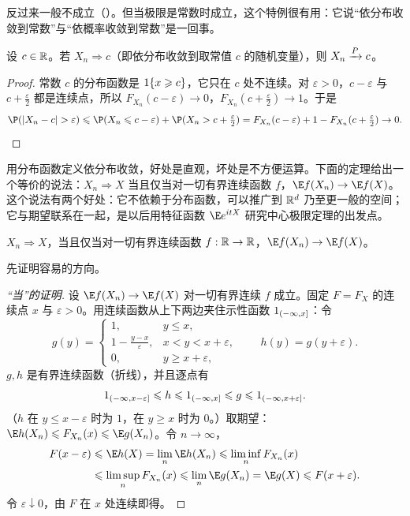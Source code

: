 反过来一般不成立（）。但当极限是常数时成立，这个特例很有用：它说“依分布收敛到常数”与“依概率收敛到常数”是一回事。

\begin{theorem}\label{thm:convergence:d-to-constant}
设 $c\in\mathbb{R}$。若 $X_n\Rightarrow c$（即依分布收敛到取常值 $c$ 的随机变量），则 $X_n\xrightarrow{P} c$。
\end{theorem}
\begin{proof}
常数 $c$ 的分布函数是 $1\{x\geqslant c\}$，它只在 $c$ 处不连续。对 $\varepsilon>0$，$c-\varepsilon$ 与 $c+\frac\varepsilon2$ 都是连续点，所以 $F_{X_n}(c-\varepsilon)\to0$，$F_{X_n}(c+\frac\varepsilon2)\to1$。于是
\[
\P(\abs{X_n-c}>\varepsilon)\leqslant \P(X_n\leqslant c-\varepsilon)+\P(X_n>c+\tfrac\varepsilon2)=F_{X_n}(c-\varepsilon)+1-F_{X_n}(c+\tfrac\varepsilon2)\to0 .\qedhere
\]
\end{proof}


用分布函数定义依分布收敛，好处是直观，坏处是不方便运算。下面的定理给出一个等价的说法：$X_n\Rightarrow X$ 当且仅当对一切有界连续函数 $f$，$\E f(X_n)\to \E f(X)$。这个说法有两个好处：它不依赖于分布函数，可以推广到 $\mathbb{R}^d$ 乃至更一般的空间；它与期望联系在一起，是以后用特征函数 $\E e^{itX}$ 研究中心极限定理的出发点。

\begin{theorem}[依分布收敛的等价刻画]\label{thm:convergence:bounded-continuous}
$X_n\Rightarrow X$，当且仅当对一切有界连续函数 $f:\mathbb{R}\to\mathbb{R}$，$\E f(X_n)\to \E f(X)$。
\end{theorem}

先证明容易的方向。

\begin{proof}[“当”的证明]
设 $\E f(X_n)\to \E f(X)$ 对一切有界连续 $f$ 成立。固定 $F=F_X$ 的连续点 $x$ 与 $\varepsilon>0$。用连续函数从上下两边夹住示性函数 $1_{(-\infty,x]}$：令
\[
g(y)=\begin{cases}1,&y\leqslant x,\\1-\frac{y-x}\varepsilon,&x<y<x+\varepsilon,\\0,&y\geqslant x+\varepsilon,\end{cases}\qquad h(y)=g(y+\varepsilon).
\]
$g,h$ 是有界连续函数（折线），并且逐点有
\[
1_{(-\infty,x-\varepsilon]}\leqslant h\leqslant1_{(-\infty,x]}\leqslant g\leqslant1_{(-\infty,x+\varepsilon]}.
\]
（$h$ 在 $y\leqslant x-\varepsilon$ 时为 $1$，在 $y\geqslant x$ 时为 $0$。）取期望：$\E h(X_n)\leqslant F_{X_n}(x)\leqslant \E g(X_n)$。令 $n\to\infty$，
\[
\begin{aligned}
F(x-\varepsilon)&\leqslant \E h(X)=\lim_n\E h(X_n)\leqslant\liminf_nF_{X_n}(x)\\
&\leqslant\limsup_nF_{X_n}(x)\leqslant\lim_n\E g(X_n)=\E g(X)\leqslant F(x+\varepsilon).
\end{aligned}
\]
令 $\varepsilon\downarrow0$，由 $F$ 在 $x$ 处连续即得。
\end{proof}

